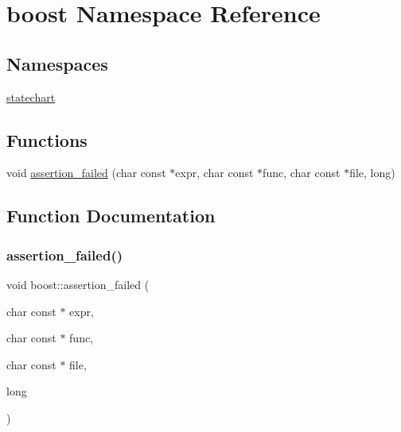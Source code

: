 \hypertarget{namespaceboost}{}\section{boost Namespace Reference}
\label{namespaceboost}
\subsection*{Namespaces}
\begin{DoxyCompactItemize}
\item 
 \mbox{\hyperlink{namespaceboost_1_1statechart}{statechart}}
\end{DoxyCompactItemize}
\subsection*{Functions}
\begin{DoxyCompactItemize}
\item 
void \mbox{\hyperlink{namespaceboost_a1611fe280039a7cebf23038e10a8efa4}{assertion\+\_\+failed}} (char const $\ast$expr, char const $\ast$func, char const $\ast$file, long)
\end{DoxyCompactItemize}


\subsection{Function Documentation}
\mbox{\label{namespaceboost_a1611fe280039a7cebf23038e10a8efa4}} 
\subsubsection{\texorpdfstring{assertion\+\_\+failed()}{assertion\_failed()}}
{\footnotesize\ttfamily void boost\+::assertion\+\_\+failed (\begin{DoxyParamCaption}\item[{char const $\ast$}]{expr,  }\item[{char const $\ast$}]{func,  }\item[{char const $\ast$}]{file,  }\item[{long}]{ }\end{DoxyParamCaption})}

